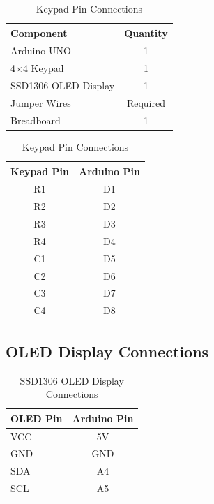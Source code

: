 \begin{table}[H]
\centering

\begin{minipage}[t]{0.48\textwidth}
\centering
\caption{Calculator Components}
\label{tab:calculator_components}

\begin{tabular}{|p{4cm}|c|}
\hline
\textbf{Component} & \textbf{Quantity} \\
\hline
Arduino UNO & 1 \\
4×4 Keypad & 1 \\
SSD1306 OLED Display & 1 \\
Jumper Wires & Required \\
Breadboard & 1 \\
\hline
\end{tabular}

\end{minipage}
\hfill
\begin{minipage}[t]{0.47\textwidth}
\centering
\caption{Keypad Pin Connections}
\label{tab:keypad_pins}

\begin{tabular}{|c|c|}
\hline
\textbf{Keypad Pin} & \textbf{Arduino Pin} \\
\hline
R1 & D1 \\
R2 & D2 \\
R3 & D3 \\
R4 & D4 \\
C1 & D5 \\
C2 & D6 \\
C3 & D7 \\
C4 & D8 \\
\hline
\end{tabular}

\end{minipage}

\end{table}


\subsection{OLED Display Connections}

\begin{table}[H]
\centering
\caption{SSD1306 OLED Display Connections}
\label{tab:oled_connections}

\begin{tabular}{|l|c|}
\hline
\textbf{OLED Pin} & \textbf{Arduino Pin} \\
\hline
VCC & 5V \\
GND & GND \\
SDA & A4 \\
SCL & A5 \\
\hline
\end{tabular}

\end{table}

